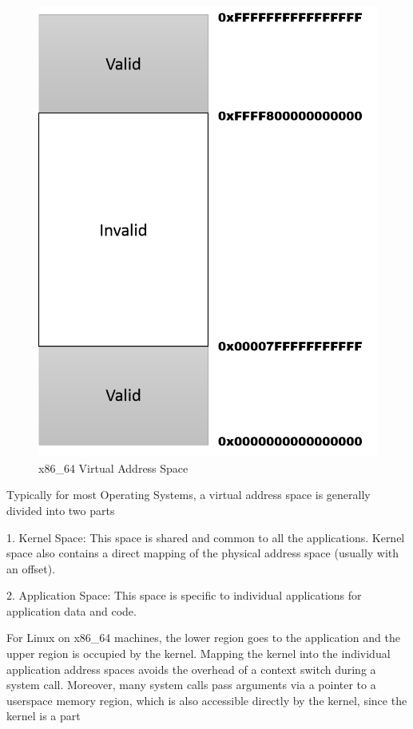 \begin{figure}
\centering
\includegraphics[scale=0.6]{figures/x86_64_VA_space.png}
\caption{x86\_64 Virtual Address Space}
\label{fig:x86_memspace}
\end{figure}

Typically for most Operating Systems, a virtual address space is generally divided into two parts 

1. Kernel Space: This space is shared and common to all the applications. Kernel space also contains a direct mapping of the physical address space (usually with an offset). 

2. Application Space: This space is specific to individual applications for application data and code. 

For Linux on x86\_64 machines, the lower region goes to the application and the upper region is occupied by the kernel. Mapping the kernel into the individual application address spaces avoids the overhead of a context switch during a system call. Moreover, many system calls pass arguments via a pointer to a userspace memory region, which is also accessible directly by the kernel, since the kernel is a part 


